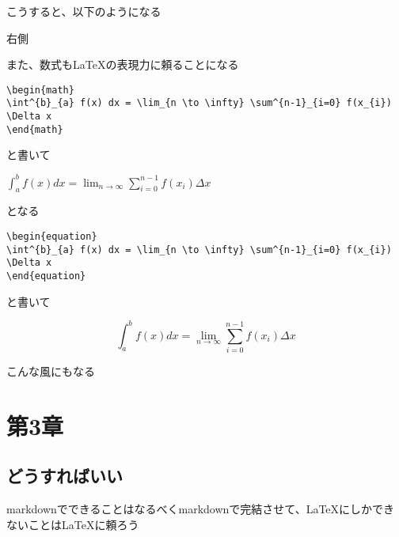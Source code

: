\documentclass[
  12pt,
  a4j]{ltjarticle}
\begin{document}
こうすると、以下のようになる

\begin{flushright}
右側
\end{flushright}

また、数式もLaTeXの表現力に頼ることになる

\begin{lstlisting}[title=LaTeXの数式]
\begin{math}
\int^{b}_{a} f(x) dx = \lim_{n \to \infty} \sum^{n-1}_{i=0} f(x_{i}) \Delta x
\end{math}
\end{lstlisting}

と書いて

\begin{math}
\int^{b}_{a} f(x) dx = \lim_{n \to \infty} \sum^{n-1}_{i=0} f(x_{i}) \Delta x
\end{math}

となる

\begin{lstlisting}[title=LaTeXの数式2]
\begin{equation}
\int^{b}_{a} f(x) dx = \lim_{n \to \infty} \sum^{n-1}_{i=0} f(x_{i}) \Delta x
\end{equation}
\end{lstlisting}

と書いて

\begin{equation}
\int^{b}_{a} f(x) dx = \lim_{n \to \infty} \sum^{n-1}_{i=0} f(x_{i}) \Delta x
\end{equation}

こんな風にもなる

\hypertarget{ux7b2c3ux7ae0}{%
\section{第3章}\label{ux7b2c3ux7ae0}}

\hypertarget{ux3069ux3046ux3059ux308cux3070ux3044ux3044}{%
\subsection{どうすればいい}\label{ux3069ux3046ux3059ux308cux3070ux3044ux3044}}

markdownでできることはなるべくmarkdownで完結させて、LaTeXにしかできないことはLaTeXに頼ろう
\end{document}
